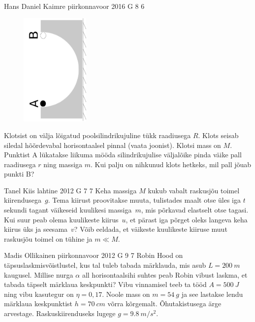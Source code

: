 \documentclass[11pt, twoside]{article}
\begin{document}
{%
{Hans Daniel Kaimre} %
{piirkonnavoor} %
{2016} %
{G 8} %
{6} %
{
\ifStatement
\begin{figure}
	\vspace{-15pt}
	\includegraphics[angle=-90,origin=c,width=0.3\textwidth]{2016-v2g-08-halfpipe.pdf}
\end{figure}
Klotsist on välja lõigatud poolsilindrikujuline tükk raadiusega $R$. Klots seisab siledal hõõrdevabal horisontaalsel pinnal (vaata joonist). Klotsi mass on $M$. Punktist A lükatakse liikuma mööda silindrikujulise väljalõike pinda väike pall raadiusega $r$ ning massiga $m$. Kui palju on nihkunud klots hetkeks, mil pall jõuab punkti B?
\fi
}

{Tanel Kiis} %
{lahtine} %
{2012} %
{G 7} %
{7} %
{
\ifStatement
Keha massiga $M$ kukub vabalt raskusjõu toimel kiirendusega~$g$. Tema
kiirust proovitakse muuta, tulistades maalt otse üles iga $t$ sekundi tagant
väikeseid kuulikesi massiga~$m$, mis põrkavad elastselt otse tagasi.
Kui suur peab olema kuulikeste kiirus~$u$, et pärast iga põrget oleks langeva
keha kiirus üks ja seesama~$v$? Võib eeldada, et väikeste kuulikeste kiiruse muut raskusjõu toimel on
tühine ja $m\ll M$.
\fi
}

{Madis Ollikainen} %
{piirkonnavoor} %
{2012} %
{G 9} %
{7} %
{
\ifStatement
Robin Hood on täpsuslaskmisvõistlustel, kus tal tuleb tabada märklauda, mis asub
$L=\SI{200}{m}$ kaugusel. Millise nurga $\alpha$ all horisontaalsihi suhtes
peab Robin vibust laskma, et tabada täpselt märklaua keskpunkti? Vibu vinnamisel
teeb ta tööd $A=\SI{500}{J}$ ning vibu kasutegur on $\eta=0,17$. Noole mass on
$m=\SI{54}{g}$ ja see lastakse lendu märklaua keskpunktist $h=\SI{70}{cm}$ võrra
kõrgemalt. Õhutakistusega ärge arvestage. Raskuskiirenduseks lugege
$g=\SI{9,8}{m/s^2}$.
\fi
}

}
\end{document}
